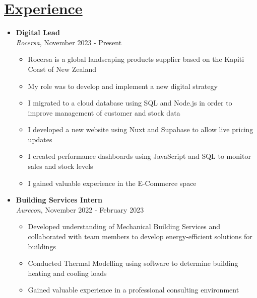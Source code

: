 \documentclass[a4paper,10pt]{article}
\begin{document}
\section*{\uline{Experience}}
\begin{itemize}
    \item \textbf{Digital Lead} \\
    \textit{Rocersa}, November 2023 - Present \\
    \vspace{-0.5cm}
    \begin{itemize}
        \item Rocersa is a global landscaping products supplier based on the Kapiti Coast of New Zealand
        \item My role was to develop and implement a new digital strategy
        \item I migrated to a cloud database using SQL and Node.js in order to improve management of customer and stock data
        \item I developed a new website using Nuxt and Supabase to allow live pricing updates
        \item I created performance dashboards using JavaScript and SQL to monitor sales and stock levels
        \item I gained valuable experience in the E-Commerce space
    \end{itemize}
    \item \textbf{Building Services Intern} \\
    \textit{Aurecon}, November 2022 - February 2023 \\
    \vspace{-0.5cm}
    \begin{itemize}
        \item Developed understanding of Mechanical Building Services and collaborated with team members to develop energy-efficient solutions for buildings
        \item Conducted Thermal Modelling using software to determine building heating and cooling loads
        \item Gained valuable experience in a professional consulting environment
    \end{itemize}
\end{itemize}
\end{document}
